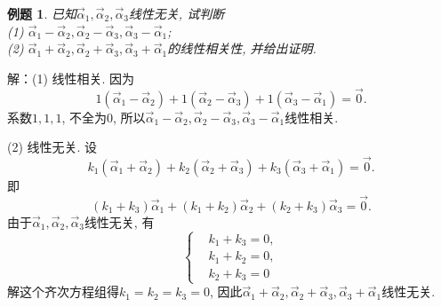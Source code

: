 \documentclass[a4paper]{book}
\newtheorem{eg}{例题}[chapter]
\begin{document}
\begin{eg}
已知$\vec{\alpha}_1,\vec{\alpha}_2,\vec{\alpha}_3$线性无关, 试判断\\
(1) $\vec{\alpha}_1-\vec{\alpha}_2, \vec{\alpha}_2-\vec{\alpha}_3,\vec{\alpha}_3-\vec{\alpha}_1$;\\
(2) $\vec{\alpha}_1+\vec{\alpha}_2, \vec{\alpha}_2+\vec{\alpha}_3,\vec{\alpha}_3+\vec{\alpha}_1$的线性相关性, 并给出证明.
\end{eg}
解：(1) 线性相关. 因为
$$1(\vec{\alpha}_1-\vec{\alpha}_2)+1( \vec{\alpha}_2-\vec{\alpha}_3)+1(\vec{\alpha}_3-\vec{\alpha}_1)=\vec{0}.$$
系数$1, 1, 1$, 不全为$0$, 所以$\vec{\alpha}_1-\vec{\alpha}_2, \vec{\alpha}_2-\vec{\alpha}_3,\vec{\alpha}_3-\vec{\alpha}_1$线性相关.

(2) 线性无关. 设
$$k_1(\vec{\alpha}_1+\vec{\alpha}_2)+k_2( \vec{\alpha}_2+\vec{\alpha}_3)+k_3(\vec{\alpha}_3+\vec{\alpha}_1)=\vec{0}.$$
即$$(k_1+k_3)\vec{\alpha}_1+(k_1+k_2)\vec{\alpha}_2+(k_2+k_3)\vec{\alpha}_3=\vec{0}.$$
由于$\vec{\alpha}_1,\vec{\alpha}_2,\vec{\alpha}_3$线性无关, 有
\begin{displaymath}\left\{\begin{aligned}&k_1+k_3=0,\\&k_1+k_2=0,\\&k_2+k_3=0\end{aligned}
\right.\end{displaymath}
解这个齐次方程组得$k_1=k_2=k_3=0$, 因此$\vec{\alpha}_1+\vec{\alpha}_2, \vec{\alpha}_2+\vec{\alpha}_3,\vec{\alpha}_3+\vec{\alpha}_1$线性无关.
\end{document}
